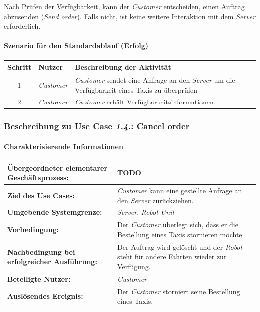 				Nach Prüfen der Verfügbarkeit, kann der \emph{Customer} entscheiden, einen Auftrag abzusenden (\emph{Send order}). Falls nicht, ist keine weitere Interaktion mit dem \emph{Server} erforderlich.
				
				\paragraph*{Szenario für den Standardablauf (Erfolg)}
	
				\begin{table}[H]
					\centering
					\begin{tabularx}{\textwidth}{|c|p{2cm}|X|}
					\hline
					Schritt & Nutzer & Beschreibung der Aktivität \\ \hline
					1 & \emph{Customer} & \emph{Customer} sendet eine Anfrage an den \emph{Server} um die Verfügbarkeit eines Taxis zu überprüfen \\
					2 & \emph{Customer} & \emph{Customer} erhält Verfügbarkeitsinformationen \\
					\hline
					\end{tabularx}
				\end{table}
				
		
			\subsubsection{Beschreibung zu Use Case \emph{1.4.}: Cancel order}
				\paragraph*{Charakterisierende Informationen}
				
				\begin{table}[H]
					\centering
					\begin{tabularx}{\textwidth}{|p{5cm}|X|}
						\hline
						\textbf{Übergeordneter elementarer Geschäftsprozess:} & TODO  \\ \hline
						\textbf{Ziel des Use Cases:} & \emph{Customer} kann eine gestellte Anfrage an den \emph{Server} zurückziehen. \\ \hline
						\textbf{Umgebende Systemgrenze:} & \emph{Server}, \emph{Robot Unit} \\ \hline
						\textbf{Vorbedingung:} & Der \emph{Customer} überlegt sich, dass er die Bestellung eines Taxis stornieren möchte. \\ \hline
						\textbf{Nachbedingung bei erfolgreicher Ausführung:} & Der Auftrag wird gelöscht und der \emph{Robot} steht für andere Fahrten wieder zur Verfügung. \\ \hline
						\textbf{Beteiligte Nutzer:} & \emph{Customer} \\ \hline
						\textbf{Auslösendes Ereignis:} & Der \emph{Customer} storniert seine Bestellung eines Taxis. \\
						\hline
					\end{tabularx}
				\end{table}
				
